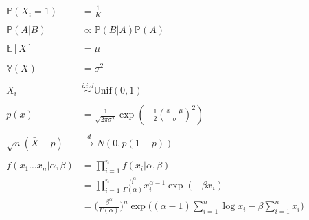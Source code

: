 \documentclass[11pt]{article}
\theoremstyle{quest}
\begin{document}
\begin{equation*}
\begin{split}
  \mathbb{P}(X_i = 1) &= \frac{1}{K} \\
  \\
  \mathbb{P}(A \vert B) &\propto \mathbb{P}(B \vert A) \mathbb{P}(A) \\
  \\
  \mathbb{E}[X] &= \mu \\
  \\
  \mathbb{V}(X) &= \sigma^2 \\
  \\
  X_i &\stackrel{i.i.d}{\sim} \text{Unif}(0, 1) \\
  \\
  p(x) &= \frac{1}{\sqrt{2\pi\sigma^2}}\exp \left(- \frac{1}{2}(\frac{x - \mu}{\sigma})^2\right) \\
  \\
  \sqrt{n}(\bar{X} - p) &\stackrel{d}{\to} N(0, p(1-p)) \\
  \\
  f(x_1 \ldots x_n \vert \alpha, \beta) 
  &= \prod_{i=1}^n f(x_i \vert \alpha, \beta) \\
  &= \prod_{i=1}^n \frac{\beta^\alpha}{\Gamma(\alpha)} x_i^{\alpha-1}\exp(-\beta x_i) \\
  &= \Big(\frac{\beta^\alpha}{\Gamma(\alpha)} \Big)^n
  \exp \Big((\alpha-1)\sum_{i=1}^n \log x_i -\beta \sum_{i=1}^n x_i\Big) 
  \\
\end{split}
\end{equation*}


\end{document}
